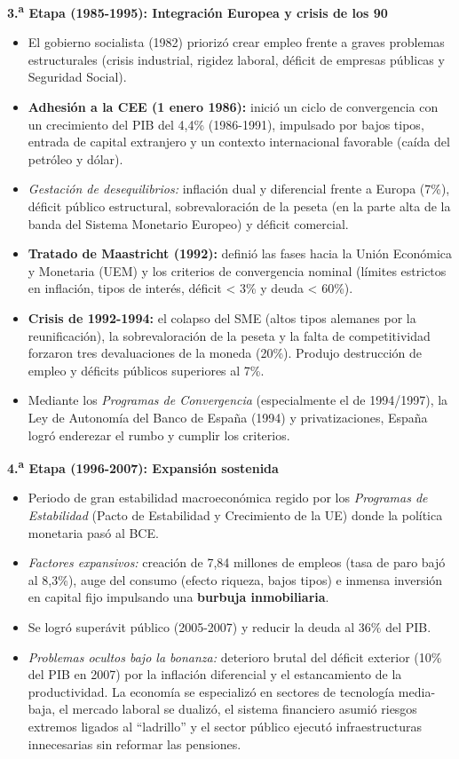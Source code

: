 \textbf{3.\textsuperscript{a} Etapa (1985-1995): Integración Europea y crisis de los 90}

\begin{itemize}
  \item El gobierno socialista (1982) priorizó crear empleo frente a graves problemas estructurales (crisis industrial, rigidez laboral, déficit de empresas públicas y Seguridad Social).
  \item \textbf{Adhesión a la CEE (1 enero 1986):} inició un ciclo de convergencia con un crecimiento del PIB del 4,4\% (1986-1991), impulsado por bajos tipos, entrada de capital extranjero y un contexto internacional favorable (caída del petróleo y dólar).
  \item \textit{Gestación de desequilibrios:} inflación dual y diferencial frente a Europa (7\%), déficit público estructural, sobrevaloración de la peseta (en la parte alta de la banda del Sistema Monetario Europeo) y déficit comercial.
  \item \textbf{Tratado de Maastricht (1992):} definió las fases hacia la Unión Económica y Monetaria (UEM) y los criterios de convergencia nominal (límites estrictos en inflación, tipos de interés, déficit < 3\% y deuda < 60\%).
  \item \textbf{Crisis de 1992-1994:} el colapso del SME (altos tipos alemanes por la reunificación), la sobrevaloración de la peseta y la falta de competitividad forzaron tres devaluaciones de la moneda (20\%). Produjo destrucción de empleo y déficits públicos superiores al 7\%.
  \item Mediante los \textit{Programas de Convergencia} (especialmente el de 1994/1997), la Ley de Autonomía del Banco de España (1994) y privatizaciones, España logró enderezar el rumbo y cumplir los criterios.
\end{itemize}

\textbf{4.\textsuperscript{a} Etapa (1996-2007): Expansión sostenida}

\begin{itemize}
  \item Periodo de gran estabilidad macroeconómica regido por los \textit{Programas de Estabilidad} (Pacto de Estabilidad y Crecimiento de la UE) donde la política monetaria pasó al BCE.
  \item \textit{Factores expansivos:} creación de 7,84 millones de empleos (tasa de paro bajó al 8,3\%), auge del consumo (efecto riqueza, bajos tipos) e inmensa inversión en capital fijo impulsando una \textbf{burbuja inmobiliaria}.
  \item Se logró superávit público (2005-2007) y reducir la deuda al 36\% del PIB.
  \item \textit{Problemas ocultos bajo la bonanza:} deterioro brutal del déficit exterior (10\% del PIB en 2007) por la inflación diferencial y el estancamiento de la productividad. La economía se especializó en sectores de tecnología media-baja, el mercado laboral se dualizó, el sistema financiero asumió riesgos extremos ligados al ``ladrillo'' y el sector público ejecutó infraestructuras innecesarias sin reformar las pensiones.
\end{itemize}

